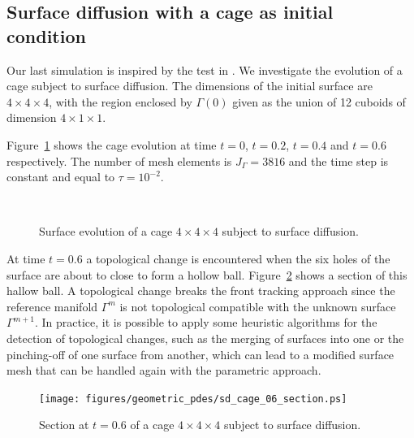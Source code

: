 \subsection{Surface diffusion with a cage as initial condition}
\label{subsec:sd_cage}
Our last simulation is inspired by the test in \cite[Fig.~15]{gflows3d}. We
investigate the evolution of a cage subject to surface diffusion. The
dimensions of the initial surface are $4 \times 4 \times 4$, with the region
enclosed by $\Gamma(0)$ given as the union of 12 cuboids of dimension $4 \times
1 \times 1$.

Figure~\ref{fig:sd_cage} shows the cage evolution at time $t=0$, $t=0.2$,
$t=0.4$ and $t=0.6$ respectively. The number of mesh elements is
$J_\Gamma=3816$ and the time step is constant and equal to $\tau=10^{-2}$.

\begin{figure}[htbp]
\centering
{}
\quad
{}
\\
\quad
{}
\caption[Surface diffusion cage]{Surface evolution of a cage $4 \times 4 \times
4$ subject to surface diffusion.}
\label{fig:sd_cage}
\end{figure}

At time $t=0.6$ a topological change is encountered when the six holes of the
surface are about to close to form a hollow ball.
Figure~\ref{fig:sd_cage_section} shows a section of this hallow ball. A
topological change breaks the front tracking approach since the reference
manifold $\Gamma^m$ is not topological compatible with the unknown surface
$\Gamma^{m+1}$. In practice, it is possible to apply some heuristic algorithms
for the detection of topological changes, such as the merging of surfaces into
one or the pinching-off of one surface from another, which can lead to a
modified surface mesh that can be handled again with the parametric approach.

\begin{figure}[htbp]
\centering
\texttt{[image: figures/geometric\_pdes/sd\_cage\_06\_section.ps]}
\caption[Surface diffusion cage section]{Section at $t=0.6$ of a cage $4 \times
4 \times 4$ subject to surface diffusion.}
\label{fig:sd_cage_section}
\end{figure}

